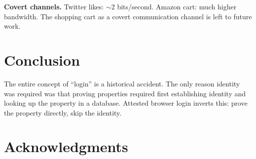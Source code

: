\documentclass[twocolumn,10pt]{article}
\begin{document}
\textbf{Covert channels.} Twitter likes: $\sim$2 bits/second. Amazon cart: much higher bandwidth. The shopping cart as a covert communication channel is left to future work.

\section{Conclusion}

The entire concept of ``login'' is a historical accident.
The only reason identity was required was that proving properties required first establishing identity and looking up the property in a database.
Attested browser login inverts this: prove the property directly, skip the identity.

\section*{Acknowledgments}




\end{document}

